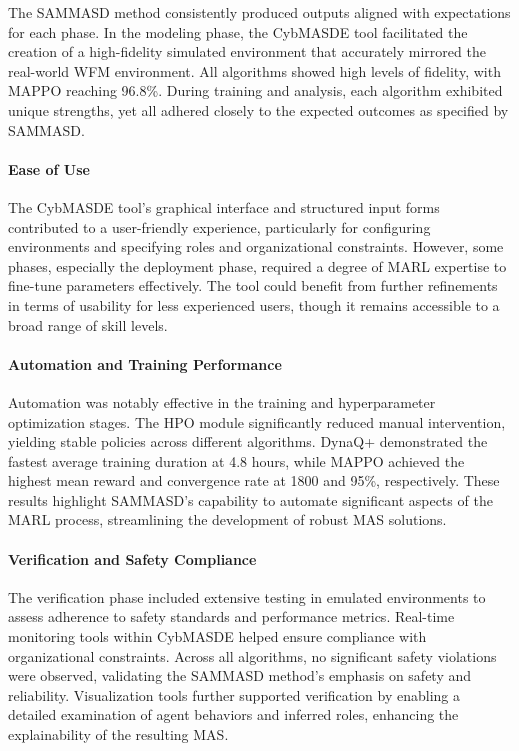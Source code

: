 \documentclass[sigconf,anonymous]{aamas}
\begin{document}
The SAMMASD method consistently produced outputs aligned with expectations for each phase. In the modeling phase, the CybMASDE tool facilitated the creation of a high-fidelity simulated environment that accurately mirrored the real-world WFM environment. All algorithms showed high levels of fidelity, with MAPPO reaching 96.8\%. During training and analysis, each algorithm exhibited unique strengths, yet all adhered closely to the expected outcomes as specified by SAMMASD.

\paragraph{Ease of Use}

The CybMASDE tool's graphical interface and structured input forms contributed to a user-friendly experience, particularly for configuring environments and specifying roles and organizational constraints. However, some phases, especially the deployment phase, required a degree of MARL expertise to fine-tune parameters effectively. The tool could benefit from further refinements in terms of usability for less experienced users, though it remains accessible to a broad range of skill levels.

\paragraph{Automation and Training Performance}

Automation was notably effective in the training and hyperparameter optimization stages. The HPO module significantly reduced manual intervention, yielding stable policies across different algorithms. DynaQ+ demonstrated the fastest average training duration at 4.8 hours, while MAPPO achieved the highest mean reward and convergence rate at 1800 and 95\%, respectively. These results highlight SAMMASD's capability to automate significant aspects of the MARL process, streamlining the development of robust MAS solutions.

\paragraph{Verification and Safety Compliance}

The verification phase included extensive testing in emulated environments to assess adherence to safety standards and performance metrics. Real-time monitoring tools within CybMASDE helped ensure compliance with organizational constraints. Across all algorithms, no significant safety violations were observed, validating the SAMMASD method's emphasis on safety and reliability. Visualization tools further supported verification by enabling a detailed examination of agent behaviors and inferred roles, enhancing the explainability of the resulting MAS.
\end{document}
